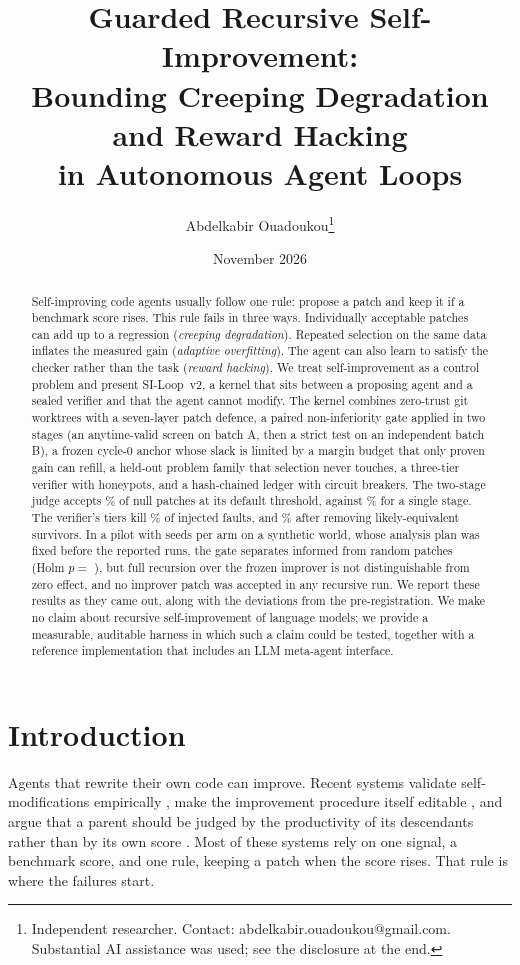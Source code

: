 \documentclass[11pt]{article}
\title{Guarded Recursive Self-Improvement:\\[2pt] Bounding Creeping Degradation and Reward Hacking\\[2pt] in Autonomous Agent Loops}
\author{Abdelkabir Ouadoukou\thanks{Independent researcher. Contact: abdelkabir.ouadoukou@gmail.com.
Substantial AI assistance was used; see the disclosure at the end.}}
\date{November 2026\\[9pt]{\small\repoline}}
\begin{document}
\maketitle
\vspace{-1.6em}

\begin{abstract}
Self-improving code agents usually follow one rule: propose a patch and keep it if a benchmark score rises.
This rule fails in three ways. Individually acceptable patches can add up to a regression (\emph{creeping degradation}).
Repeated selection on the same data inflates the measured gain (\emph{adaptive overfitting}). The agent can also learn to satisfy the checker
rather than the task (\emph{reward hacking}). We treat self-improvement as a control problem and present SI-Loop~v2, a kernel that sits between a
proposing agent and a sealed verifier and that the agent cannot modify. The kernel combines zero-trust git worktrees with a seven-layer patch defence,
a paired non-inferiority gate applied in two stages (an anytime-valid screen on batch A, then a strict test on an independent batch B),
a frozen cycle-0 anchor whose slack is limited by a margin budget that only proven gain can refill, a held-out problem family that selection never touches,
a three-tier verifier with honeypots, and a hash-chained ledger with circuit breakers.
The two-stage judge accepts \FATwo\% of null patches at its default threshold, against \FASingle\% for a single stage.
The verifier's tiers kill \MutRate\% of \MutN{} injected faults, and \MutAdj\% after removing likely-equivalent survivors.
In a pilot with \NSeeds{} seeds per arm on a synthetic world, whose analysis plan was fixed before the reported runs, the gate separates informed from random patches (Holm $p=$ \HTwoHolm),
but full recursion over the frozen improver is not distinguishable from zero effect, and no improver patch was accepted in any recursive run.
We report these results as they came out, along with the deviations from the pre-registration.
We make no claim about recursive self-improvement of language models; we provide a measurable, auditable harness in which such a claim could be tested,
together with a reference implementation that includes an LLM meta-agent interface.
\end{abstract}

\section{Introduction}

Agents that rewrite their own code can improve. Recent systems validate self-modifications empirically \citep{zhang2025dgm},
make the improvement procedure itself editable \citep{zhang2026hyperagents}, and argue that a parent should be judged by the productivity of its descendants
rather than by its own score \citep{wang2026hgm}. Most of these systems rely on one signal, a benchmark score, and one rule, keeping a patch when the score rises.
That rule is where the failures start.
\end{document}

